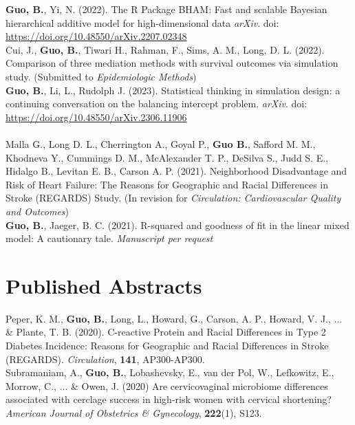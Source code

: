 \textbf{Guo, B.}, Yi, N. (2022). The R Package BHAM: Fast and scalable Bayesian hierarchical additive model for high-dimensional data  {\it arXiv}. doi: \url{https://doi.org/10.48550/arXiv.2207.02348}\\

Cui, J., \textbf{Guo, B.}, Tiwari H., Rahman, F., Sims, A. M., Long, D. L. (2022). Comparison of three mediation methods with survival outcomes via simulation study. (Submitted to \textit{Epidemiologic Methods})\\

\textbf{Guo, B.}, Li, L., Rudolph J. (2023). Statistical thinking in simulation design: a continuing conversation on the balancing intercept problem. {\it arXiv}. doi: \url{ 	
https://doi.org/10.48550/arXiv.2306.11906}\\\\

Malla G., Long D. L., Cherrington A., Goyal P., \textbf{Guo B.}, Safford M. M., Khodneva Y., Cummings D. M., McAlexander T. P., DeSilva S., Judd S. E., Hidalgo B., Levitan E. B., Carson A. P. (2021). Neighborhood Disadvantage and Risk of Heart Failure: The Reasons for Geographic and Racial Differences in Stroke (REGARDS) Study. (In revision for \textit{Circulation: Cardiovascular Quality and Outcomes})\\

\textbf{Guo, B.}, Jaeger, B. C. (2021). R-squared and goodness of fit in the linear mixed model: A cautionary tale. {\it Manuscript per request}\\


\section{Published Abstracts}
Peper, K. M., \textbf{Guo, B.}, Long, L., Howard, G., Carson, A. P., Howard, V. J., ... \& Plante, T. B.  (2020). C-reactive Protein and Racial Differences in Type 2 Diabetes Incidence: Reasons for Geographic and Racial Differences in Stroke (REGARDS). \textit{Circulation}, {\bf 141}, AP300-AP300. \\

Subramaniam, A., \textbf{Guo, B.}, Lobashevsky, E., van der Pol, W., Lefkowitz, E., Morrow, C., ... \& Owen, J.  (2020) Are cervicovaginal microbiome differences associated with cerclage success in high-risk women with cervical shortening? \textit{American Journal of Obstetrics \& Gynecology}, {\bf 222}(1), S123.\\

